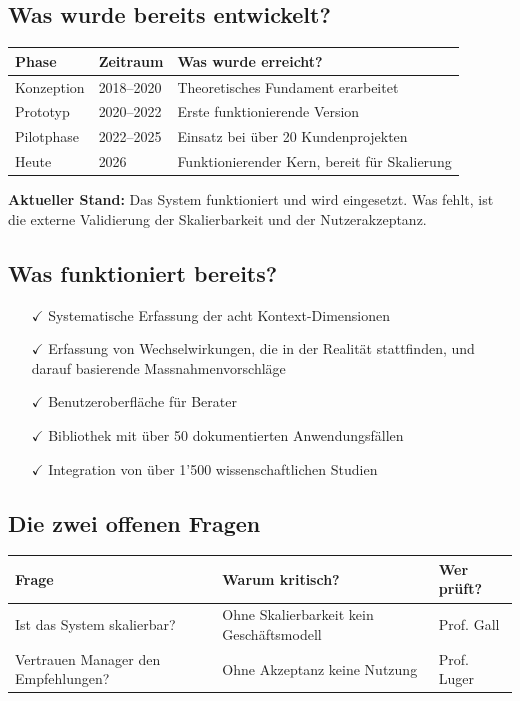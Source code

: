 \documentclass[11pt,a4paper]{article}
\begin{document}
\subsection{Was wurde bereits entwickelt?}

\begin{table}[h]
\centering
\begin{tabular}{@{}L{3cm}L{3cm}L{7cm}@{}}
\toprule
\textbf{Phase} & \textbf{Zeitraum} & \textbf{Was wurde erreicht?} \\
\midrule
Konzeption & 2018--2020 & Theoretisches Fundament erarbeitet \\
Prototyp & 2020--2022 & Erste funktionierende Version \\
Pilotphase & 2022--2025 & Einsatz bei über 20 Kundenprojekten \\
Heute & 2026 & Funktionierender Kern, bereit für Skalierung \\
\bottomrule
\end{tabular}
\end{table}

\textbf{Aktueller Stand:} Das System funktioniert und wird eingesetzt. Was fehlt, ist die externe Validierung der Skalierbarkeit und der Nutzerakzeptanz.

\subsection{Was funktioniert bereits?}

\begin{itemize}
    \item[$\checkmark$] Systematische Erfassung der acht Kontext-Dimensionen
    \item[$\checkmark$] Erfassung von Wechselwirkungen, die in der Realität stattfinden, und darauf basierende Massnahmenvorschläge
    \item[$\checkmark$] Benutzeroberfläche für Berater
    \item[$\checkmark$] Bibliothek mit über 50 dokumentierten Anwendungsfällen
    \item[$\checkmark$] Integration von über 1'500 wissenschaftlichen Studien
\end{itemize}

\subsection{Die zwei offenen Fragen}

\begin{table}[h]
\centering
\begin{tabular}{@{}L{5cm}L{5cm}L{3cm}@{}}
\toprule
\textbf{Frage} & \textbf{Warum kritisch?} & \textbf{Wer prüft?} \\
\midrule
Ist das System skalierbar? & Ohne Skalierbarkeit kein Geschäftsmodell & Prof. Gall \\
Vertrauen Manager den Empfehlungen? & Ohne Akzeptanz keine Nutzung & Prof. Luger \\
\bottomrule
\end{tabular}
\end{table}
\end{document}

